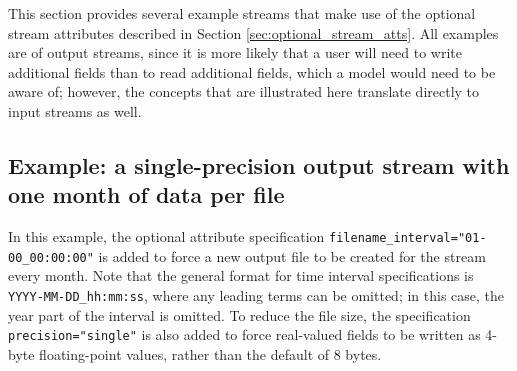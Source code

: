 This section provides several example streams that make use of the optional stream attributes described in Section \ref{sec:optional_stream_atts}.
All examples are of output streams, since it is more likely that a user will need to write additional fields than to read additional fields, which a model would need to be aware of; however, the concepts that are illustrated here translate directly to input streams as well.

\subsection{Example: a single-precision output stream with one month of data per file}
\label{sec:filename_interval_example}

In this example, the optional attribute specification {\tt filename\_interval="01-00\_00:00:00"} is added to force a new
output file to be created for the stream every month. Note that the general format for time interval specifications is {\tt YYYY-MM-DD\_hh:mm:ss},
where any leading terms can be omitted; in this case, the year part of the interval is omitted. To reduce the file size, the specification
{\tt precision="single"} is also added to force real-valued fields to be written as 4-byte floating-point values, rather than the default of 8 bytes.

\vspace{12pt}
 \newline
\hspace*{\mutindent}{\tt type="output"} \newline
\hspace*{\mutindent}{\tt filename\_template="diagnostics.\$Y-\$M.nc"} \newline
\hspace*{\mutindent}{\tt filename\_interval="01-00\_00:00:00"} \newline
\hspace*{\mutindent}{\tt precision="single"} \newline
\hspace*{\mutindent}{\tt output\_interval="6:00:00" >} \newline
\newline
\hspace*{1cm}{\tt <var name="u10"/>} \newline
\hspace*{1cm}{\tt <var name="v10"/>} \newline
\hspace*{1cm}{\tt <var name="t2"/>} \newline
\hspace*{1cm}{\tt <var name="q2"/>} \newline
\newline
{} \newline
\vspace{12pt}

